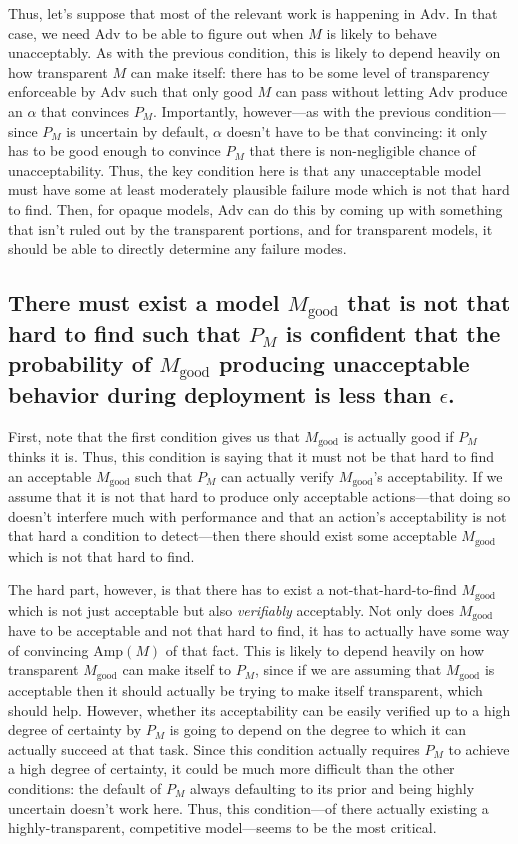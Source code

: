 \documentclass{amsart}
\begin{document}
Thus, let's suppose that most of the relevant work is happening in $\text{Adv}$. In that case, we need $\text{Adv}$ to be able to figure out when $M$ is likely to behave unacceptably. As with the previous condition, this is likely to depend heavily on how transparent $M$ can make itself: there has to be some level of transparency enforceable by $\text{Adv}$ such that only good $M$ can pass without letting $\text{Adv}$ produce an $\alpha$ that convinces $P_M$. Importantly, however---as with the previous condition---since $P_M$ is uncertain by default, $\alpha$ doesn't have to be that convincing: it only has to be good enough to convince $P_M$ that there is non-negligible chance of unacceptability. Thus, the key condition here is that any unacceptable model must have some at least moderately plausible failure mode which is not that hard to find. Then, for opaque models, $\text{Adv}$ can do this by coming up with something that isn't ruled out by the transparent portions, and for transparent models, it should be able to directly determine any failure modes.

\subsection{There must exist a model $M_\text{good}$ that is not that hard to find such that $P_M$ is confident that the probability of $M_\text{good}$ producing unacceptable behavior during deployment is less than $\epsilon$.} First, note that the first condition gives us that $M_\text{good}$ is actually good if $P_M$ thinks it is. Thus, this condition is saying that it must not be that hard to find an acceptable $M_\text{good}$ such that $P_M$ can actually verify $M_\text{good}$'s acceptability. If we assume that it is not that hard to produce only acceptable actions---that doing so doesn't interfere much with performance and that an action's acceptability is not that hard a condition to detect---then there should exist some acceptable $M_\text{good}$ which is not that hard to find.

The hard part, however, is that there has to exist a not-that-hard-to-find $M_\text{good}$ which is not just acceptable but also \textit{verifiably} acceptably. Not only does $M_\text{good}$ have to be acceptable and not that hard to find, it has to actually have some way of convincing $\text{Amp}(M)$ of that fact. This is likely to depend heavily on how transparent $M_\text{good}$ can make itself to $P_M$, since if we are assuming that $M_\text{good}$ is acceptable then it should actually be trying to make itself transparent, which should help. However, whether its acceptability can be easily verified up to a high degree of certainty by $P_M$ is going to depend on the degree to which it can actually succeed at that task. Since this condition actually requires $P_M$ to achieve a high degree of certainty, it could be much more difficult than the other conditions: the default of $P_M$ always defaulting to its prior and being highly uncertain doesn't work here. Thus, this condition---of there actually existing a highly-transparent, competitive model---seems to be the most critical.
\end{document}

